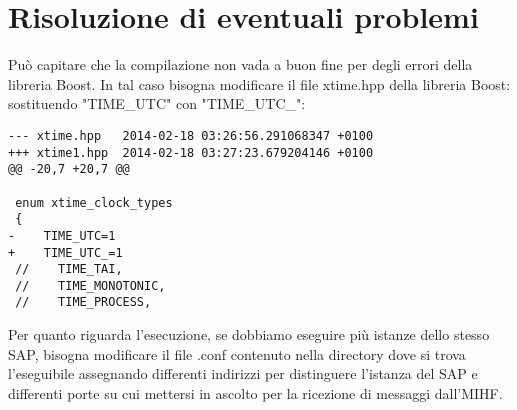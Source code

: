 \section{Risoluzione di eventuali problemi}
Può capitare che la compilazione non vada a buon fine per degli errori della libreria Boost. In tal caso bisogna modificare il file xtime.hpp della libreria Boost:\\
sostituendo "TIME\_UTC" con "TIME\_UTC\_":\\
\begin{verbatim}
--- xtime.hpp   2014-02-18 03:26:56.291068347 +0100
+++ xtime1.hpp  2014-02-18 03:27:23.679204146 +0100
@@ -20,7 +20,7 @@

 enum xtime_clock_types
 {
-    TIME_UTC=1
+    TIME_UTC_=1
 //    TIME_TAI,
 //    TIME_MONOTONIC,
 //    TIME_PROCESS,
\end{verbatim}

Per quanto riguarda l'esecuzione, se dobbiamo eseguire più istanze dello stesso SAP, bisogna modificare il file .conf contenuto nella directory dove si trova l'eseguibile assegnando differenti indirizzi per distinguere l'istanza del SAP e differenti porte su cui mettersi in ascolto per la ricezione di messaggi dall'MIHF.